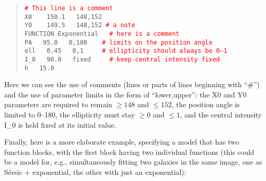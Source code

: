 \documentclass[10pt,a4paper,article]{memoir}
\newcommand{\red}{\textcolor{red}}
\begin{document}
\begin{quote}
  \texttt{\red{\# This line is a comment}}\\
  
  \texttt{X0 ~~   150.1 ~  148,152}\\
  \texttt{Y0 ~~   149.5 ~  148,152         \red{\# a note}}\\
  \texttt{FUNCTION   Exponential  ~ \red{\# here is a comment}}\\
  \texttt{PA  ~  95.0  ~ 0,180   ~~   \red{\# limits on the position angle}}\\
  \texttt{ell  ~  0.45 ~ 0,1     ~~~ \red{\# ellipticity should always be 0--1}}\\
  \texttt{I\_0 ~  90.0 ~  fixed ~~~ \red{\# keep central intensity fixed}}\\
  \texttt{h    ~ 15.0}\\
\end{quote}

Here we can see the use of comments (lines or parts of lines beginning with
``\#'') and the use of parameter limits in the form of ``lower,upper'': the X0
and Y0 parameters are required to remain $\geq 148$ and $\leq 152$, the position
angle is limited to 0--180, the ellipticity must stay $\geq 0$ and $\leq 1$, and
the central intensity I\_0 is held fixed at its initial value.

Finally, here is a more elaborate example, specifying a model that has two
function blocks, with the first block having two individual functions (this
could be a model for, e.g., simultaneously fitting two galaxies in the same
image, one as S\'ersic + exponential, the other with just an exponential):
\end{document}
